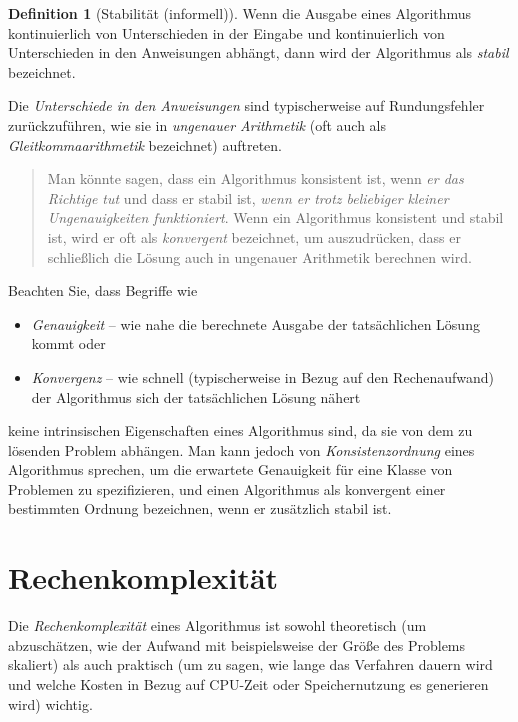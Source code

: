 \documentclass[
]{book}
\providecommand{\tightlist}{%
  \setlength{\itemsep}{0pt}\setlength{\parskip}{0pt}}
\newenvironment {JHSAYS} [0] {\begin{quote}\color{jhsc}} {\end{quote}}
\theoremstyle{definition}
\newtheorem{definition}{Definition}[chapter]
\theoremstyle{definition}
\theoremstyle{definition}
\theoremstyle{definition}
\theoremstyle{remark}
\begin{document}
\begin{definition}[Stabilität (informell)]
\protect\hypertarget{def:stability}{}\label{def:stability}Wenn die Ausgabe eines Algorithmus kontinuierlich von Unterschieden in der Eingabe und kontinuierlich von Unterschieden in den Anweisungen abhängt, dann wird der Algorithmus als \emph{stabil} bezeichnet.
\end{definition}

Die \emph{Unterschiede in den Anweisungen} sind typischerweise auf Rundungsfehler zurückzuführen, wie sie in \emph{ungenauer Arithmetik} (oft auch als \emph{Gleitkommaarithmetik} bezeichnet) auftreten.

\leavevmode{}%
\begin{JHSAYS}
Man könnte sagen, dass ein Algorithmus konsistent ist, wenn \emph{er das Richtige tut} und dass er stabil ist, \emph{wenn er trotz beliebiger kleiner Ungenauigkeiten funktioniert}. Wenn ein Algorithmus konsistent und stabil ist, wird er oft als \emph{konvergent} bezeichnet, um auszudrücken, dass er schließlich die Lösung auch in ungenauer Arithmetik berechnen wird.

\end{JHSAYS}

Beachten Sie, dass Begriffe wie

\begin{itemize}
\tightlist
\item
  \emph{Genauigkeit} -- wie nahe die berechnete Ausgabe der tatsächlichen Lösung kommt oder
\item
  \emph{Konvergenz} -- wie schnell (typischerweise in Bezug auf den Rechenaufwand) der Algorithmus sich der tatsächlichen Lösung nähert
\end{itemize}

keine intrinsischen Eigenschaften eines Algorithmus sind, da sie von dem zu lösenden Problem abhängen.
Man kann jedoch von \emph{Konsistenzordnung} eines Algorithmus sprechen, um die erwartete Genauigkeit für eine Klasse von Problemen zu spezifizieren, und einen Algorithmus als konvergent einer bestimmten Ordnung bezeichnen, wenn er zusätzlich stabil ist.

\hypertarget{rechenkomplexituxe4t}{%
\section{Rechenkomplexität}\label{rechenkomplexituxe4t}}

Die \emph{Rechenkomplexität} eines Algorithmus ist sowohl theoretisch (um abzuschätzen, wie der Aufwand mit beispielsweise der Größe des Problems skaliert) als auch praktisch (um zu sagen, wie lange das Verfahren dauern wird und welche Kosten in Bezug auf CPU-Zeit oder Speichernutzung es generieren wird) wichtig.
\end{document}
